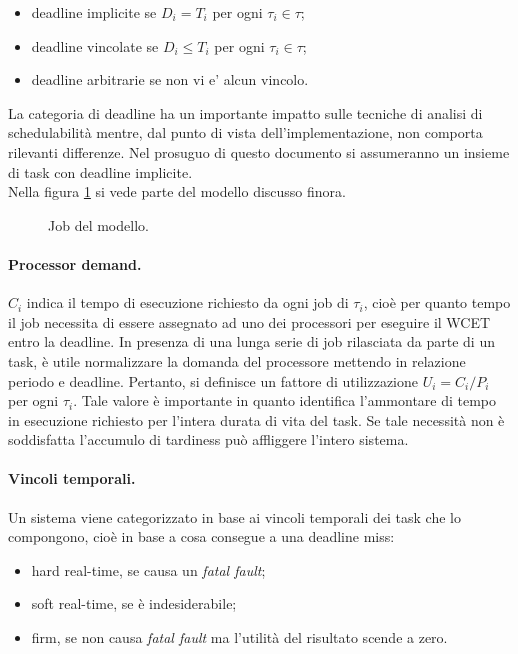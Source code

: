 \begin{itemize}
	\item deadline implicite se $D_i = T_i$ per ogni $\tau_i \in \tau$;
	\item deadline vincolate se $D_i \leq T_i$ per ogni $\tau_i \in \tau$;
	\item deadline arbitrarie se non vi e' alcun vincolo.
\end{itemize}

La categoria di deadline ha un importante impatto sulle tecniche di analisi di schedulabilità mentre, dal punto di vista dell'implementazione, non comporta rilevanti differenze. Nel prosuguo di questo documento si assumeranno un insieme di task con deadline implicite.\\

Nella figura \ref{fig:model_job} si vede parte del modello discusso finora.

\begin{figure}
\centering
\model
\caption{Job del modello.}
\label{fig:model_job}
\end{figure}

\paragraph{Processor demand.} $C_i$ indica il tempo di esecuzione richiesto da ogni job di $\tau_i$, cioè per quanto tempo il job necessita di essere assegnato ad uno dei processori per eseguire il WCET entro la deadline. In presenza di una lunga serie di job rilasciata da parte di un task, è utile normalizzare la domanda del processore mettendo in relazione periodo e deadline. Pertanto, si definisce un fattore di utilizzazione $U_i = C_i / P_i$ per ogni $\tau_i$. Tale valore è importante in quanto identifica l'ammontare di tempo in esecuzione richiesto per l'intera durata di vita del task. Se tale necessità non è soddisfatta l'accumulo di tardiness può affliggere l'intero sistema.

\paragraph{Vincoli temporali.} Un sistema viene categorizzato in base ai vincoli temporali dei task che lo compongono, cioè in base a cosa consegue a una deadline miss:

\begin{itemize}
	\item hard real-time, se causa un \textit{fatal fault};
	\item soft real-time, se è indesiderabile;
	\item firm, se non causa \textit{fatal fault} ma l'utilità del risultato scende a zero.
\end{itemize}

